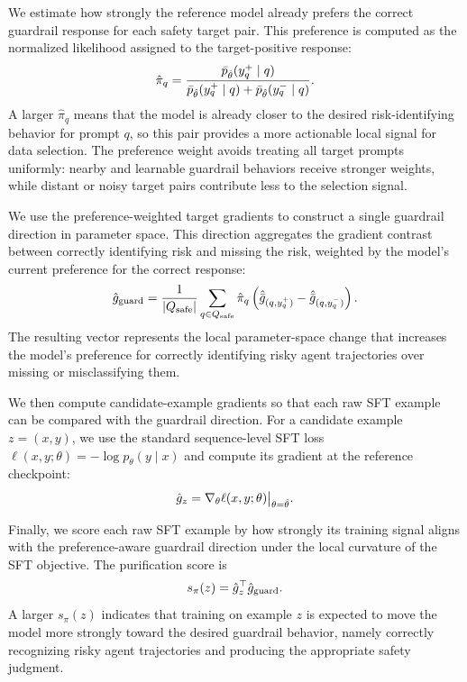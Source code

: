\documentclass{llmxive}
\begin{document}
We estimate how strongly the reference model already prefers the correct guardrail response for each safety target pair. This preference is computed as the normalized likelihood assigned to the target-positive response:
\begin{equation}
\small
\hat\pi_q
=
\frac{
\bar p_{\hat\theta}(y_q^{+}\mid q)
}{
\bar p_{\hat\theta}(y_q^{+}\mid q)
+
\bar p_{\hat\theta}(y_q^{-}\mid q)
}.
\label{eq:guardrail-positive-preference}
\end{equation}
A larger \(\hat\pi_q\) means that the model is already closer to the desired risk-identifying behavior for prompt \(q\), so this pair provides a more actionable local signal for data selection. The preference weight avoids treating all target prompts uniformly: nearby and learnable guardrail behaviors receive stronger weights, while distant or noisy target pairs contribute less to the selection signal.

We use the preference-weighted target gradients to construct a single guardrail direction in parameter space. This direction aggregates the gradient contrast between correctly identifying risk and missing the risk, weighted by the model's current preference for the correct response:
\begin{equation}
\small
\hat g_{\mathrm{guard}}
=
\frac{1}{|Q_{\mathrm{safe}}|}
\sum_{q\in Q_{\mathrm{safe}}}
\hat\pi_q
\left(
\hat{\bar g}_{(q,y_q^{+})}
-
\hat{\bar g}_{(q,y_q^{-})}
\right).
\label{eq:guardrail-target-direction}
\end{equation}
The resulting vector represents the local parameter-space change that increases the model's preference for correctly identifying risky agent trajectories over missing or misclassifying them.

We then compute candidate-example gradients so that each raw SFT example can be compared with the guardrail direction. For a candidate example \(z=(x,y)\), we use the standard sequence-level SFT loss \(\ell(x,y;\theta)=-\log p_\theta(y\mid x)\) and compute its gradient at the reference checkpoint:
\begin{equation}
\small
\hat g_z
=
\nabla_\theta \ell(x,y;\theta)\big|_{\theta=\hat\theta}.
\label{eq:guardrail-sft-gradient}
\end{equation}

Finally, we score each raw SFT example by how strongly its training signal aligns with the preference-aware guardrail direction under the local curvature of the SFT objective. The purification score is
\begin{equation}
\small
s_{\pi}(z)
=
\hat g_z^\top \hat g_{\mathrm{guard}}.
\label{eq:guardrail-prism-score}
\end{equation}
A larger \(s_{\pi}(z)\) indicates that training on example \(z\) is expected to move the model more strongly toward the desired guardrail behavior, namely correctly recognizing risky agent trajectories and producing the appropriate safety judgment.
\end{document}
